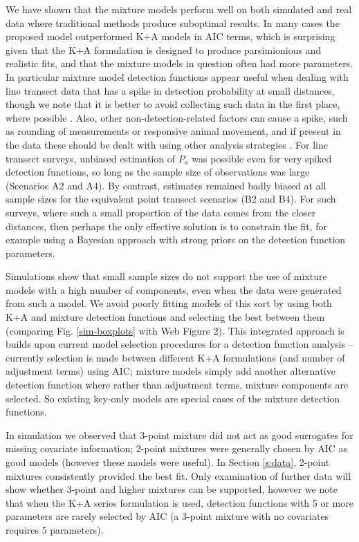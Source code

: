 \documentclass[useAMS,referee,usenatbib]{biom}
\begin{document}
We have shown that the mixture models perform well on both simulated and real data where traditional methods produce suboptimal results. In many cases the proposed model outperformed K+A models in AIC terms, which is surprising given that the K+A formulation is designed to produce parsimionious and realistic fits, and that the mixture models in question often had more parameters. In particular mixture model detection functions appear useful when dealing with line transect data that has a spike in detection probability at small distances, though we note that it is better to avoid collecting such data in the first place, where possible \citep{Buckland:2001vm}.  Also, other non-detection-related factors can cause a spike, such as rounding of measurements or responsive animal movement, and if present in the data these should be dealt with using other analysis strategies \citep[see][]{Buckland:2001vm}.  For line transect surveys, unbiased estimation of $P_a$ was possible even for very spiked detection functions, so long as the sample size of observations was large (Scenarios A2 and A4).  By contrast, estimates remained badly biased at all sample sizes for the equivalent point transect scenarios (B2 and B4). For such surveys, where such a small proportion of the data comes from the closer distances, then perhaps the only effective solution is to constrain the fit, for example using a Bayesian approach with strong priors on the detection function parameters.

Simulations show that small sample sizes do not support the use of mixture models with a high number of components, even when the data were generated from such a model. We avoid poorly fitting models of this sort by using both K+A and mixture detection functions and selecting the best between them (comparing Fig. \ref{sim-boxplots} with Web Figure 2). This integrated approach is builds upon current model selection procedures for a detection function analysis -- currently selection is made between different K+A formulations (and number of adjustment terms) using AIC; mixture models simply add another alternative detection function where rather than adjustment terms, mixture components are selected. So existing key-only models are special cases of the mixture detection functions.

In simulation we observed that 3-point mixture did not act as good surrogates for missing covariate information; 2-point mixtures were generally chosen by AIC as good models (however these models were useful). In Section \ref{s:data}, 2-point mixtures consistently provided the best fit. Only examination of further data will show whether 3-point and higher mixtures can be supported, however we note that when the K+A series formulation is used, detection functions with 5 or more parameters are rarely selected by AIC (a 3-point mixture with no covariates requires 5 parameters).
\end{document}

